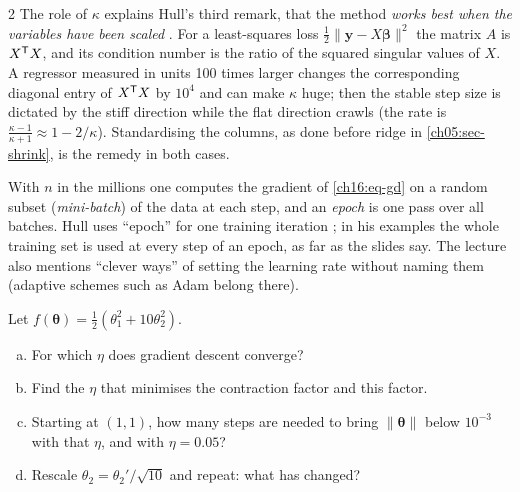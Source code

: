 \begin{paracol}{2}
The role of $\kappa$ explains Hull's third remark, that the method \emph{works best when the variables have been scaled}
. For a least-squares loss $\tfrac12\|\bm y-X\bm\beta\|^2$ the matrix $A$ is $X^{\mathsf T} X$, and its condition number is the ratio of the squared singular values of $X$. A
regressor measured in units 100 times larger changes the corresponding diagonal entry of $X^{\mathsf T} X$ by $10^4$ and can make $\kappa$ huge; then the stable step size is dictated by
the stiff direction while the flat direction crawls (the rate is $\frac{\kappa-1}{\kappa+1}\approx1-2/\kappa$). Standardising the columns, as done before ridge in \cref{ch05:sec-shrink}, is the remedy in both cases.

\begin{remark}
With $n$ in the millions one computes the gradient of \eqref{ch16:eq-gd} on a random subset (\emph{mini-batch}) of the data at each step, and an \emph{epoch} is one pass over all batches. Hull uses
``epoch'' for one training iteration ; in his examples the whole training set is used at every step of an epoch, as far as the slides say. The lecture also mentions ``clever ways'' of setting
the learning rate  without naming them (adaptive schemes such as Adam belong there).
\end{remark}

\begin{exercise}
Let $f(\bm\theta)=\tfrac12(\theta_1^2+10\theta_2^2)$.
\begin{enumerate}[(a)]
  \item For which $\eta$ does gradient descent converge?
  \item Find the $\eta$ that minimises the contraction factor and this factor.
  \item Starting at $(1,1)$, how many steps are needed to bring $\|\bm\theta\|$ below $10^{-3}$ with that $\eta$,
      and with $\eta=0.05$?
  \item Rescale $\theta_2=\theta_2'/\sqrt{10}$ and repeat: what has changed?
\end{enumerate}
\end{exercise}


\end{paracol}

